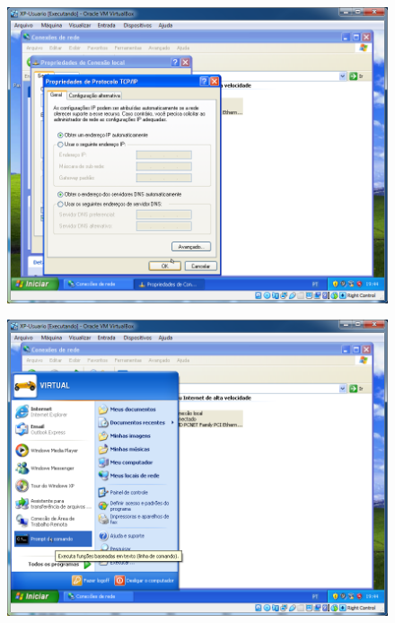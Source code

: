 \documentclass[10pt]{article}
\begin{document}
\begin{figure}[H]
    \centering
    \caption{}
    \label{fig:5324}
    \includegraphics[width=\linewidth]{images/windows_server/dhcp/024.png}
\end{figure}
\begin{figure}[H]
    \centering
    \caption{}
    \label{fig:5325}
    \includegraphics[width=\linewidth]{images/windows_server/dhcp/027.png}
\end{figure}
\end{document}
